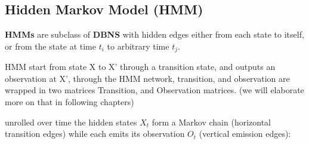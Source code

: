 \documentclass[4apaper,12pt]{book}
\begin{document}
\begin{description}
    \subsection{Hidden Markov Model (HMM)}
    \begin{description}
    \item \textbf{HMMs} are subclass of \textbf{DBNS} with hidden edges either from each state to itself, or from the state at time $t_i$ to arbitrary time $t_j$.
    \item HMM start from state X to X' through a transition state, and outputs an observation at X', through the HMM network, transition, and observation are wrapped in two matrices Transition, and Observation matrices. (we will elaborate more on that in following chapters)
    \item unrolled over time the hidden states $X_t$ form a Markov chain (horizontal transition edges) while each emits its observation $O_t$ (vertical emission edges):
    \item {}
    \end{description}

  \end{description}
\end{document}
